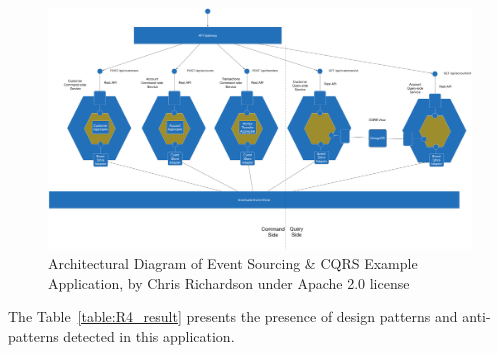\documentclass{Configuration_Files/PoliMi3i_thesis}
\begin{document}
\begin{figure}[H]
\centering
\includegraphics[width=1\textwidth]{myImages/R4.png}
\caption{Architectural Diagram of Event Sourcing \& CQRS Example Application, by Chris Richardson under Apache 2.0 license}
\label{fig:R4_arch}
\end{figure}

The Table~\ref{table:R4_result} presents the presence of design patterns and anti-patterns detected in this application.
\end{document}

